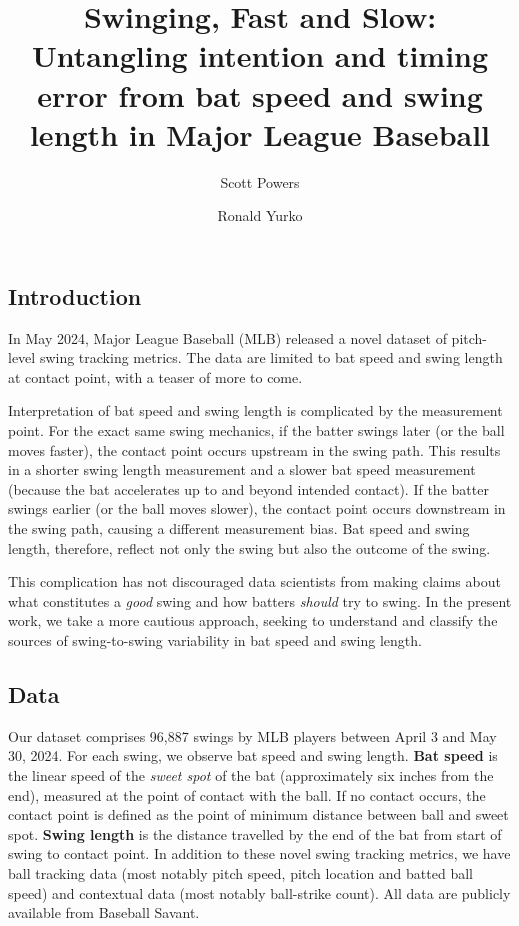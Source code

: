 \documentclass{article}
\title{Swinging, Fast and Slow: Untangling intention and timing error from bat speed and swing length in Major League Baseball}
\date{}
\author[1]{Scott Powers}
\author[2]{Ronald Yurko}
\affil[1]{Department of Sport Management, Rice University}
\affil[2]{Department of Statistics \& Data Science, Carnegie Mellon University}
\begin{document}
\maketitle

\subsection*{Introduction}

In May 2024, Major League Baseball (MLB) released a novel dataset of pitch-level swing tracking metrics. The data are limited to bat speed and swing length at contact point, with a teaser of more to come.

Interpretation of bat speed and swing length is complicated by the measurement point. For the exact same swing mechanics, if the batter swings later (or the ball moves faster), the contact point occurs upstream in the swing path. This results in a shorter swing length measurement and a slower bat speed measurement (because the bat accelerates up to and beyond intended contact). If the batter swings earlier (or the ball moves slower), the contact point occurs downstream in the swing path, causing a different measurement bias. Bat speed and swing length, therefore, reflect not only the swing but also the outcome of the swing.

This complication has not discouraged data scientists from making claims about what constitutes a {\it good} swing and how batters {\it should} try to swing. In the present work, we take a more cautious approach, seeking to understand and classify the sources of swing-to-swing variability in bat speed and swing length.

\subsection*{Data}

Our dataset comprises 96,887 swings by MLB players between April 3 and May 30, 2024. For each swing, we observe bat speed and swing length. {\bf Bat speed} is the linear speed of the {\it sweet spot} of the bat (approximately six inches from the end), measured at the point of contact with the ball. If no contact occurs, the contact point is defined as the point of minimum distance between ball and sweet spot. {\bf Swing length} is the distance travelled by the end of the bat from start of swing to contact point. In addition to these novel swing tracking metrics, we have ball tracking data (most notably pitch speed, pitch location and batted ball speed) and contextual data (most notably ball-strike count). All data are publicly available from Baseball Savant.
\end{document}
